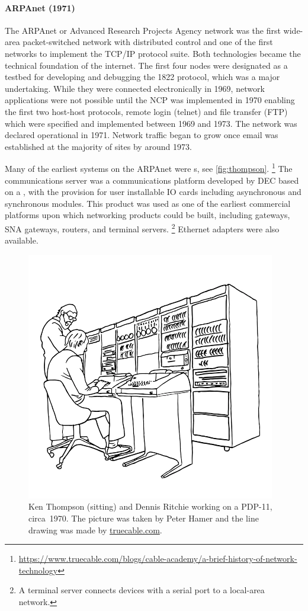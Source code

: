 {\paragraph{ARPAnet (1971)}
The ARPAnet or Advanced Research Projects Agency network was the first wide-area packet-switched network with distributed control and one of the first networks to implement the \acs{TCP}/\acs{IP} protocol suite.
Both technologies became the technical foundation of the internet.
The first four nodes were designated as a testbed for developing and debugging the 1822 protocol, which was a major undertaking.
While they were connected electronically in 1969, network applications were not possible until the \gls{NCP} was implemented in 1970 enabling the first two host-host protocols, remote login (telnet) and file transfer (\acs{FTP}) which were specified and implemented between 1969 and 1973.
The network was declared operational in 1971.
Network traffic began to grow once email was established at the majority of sites by around 1973.

Many of the earliest systems on the ARPAnet were s, see \vref{fig:thompson}.%
\footnote{\href{https://www.truecable.com/blogs/cable-academy/a-brief-history-of-network-technology}{https://www.truecable.com/blogs/cable-academy/a-brief-history-of-network-technology}}
The  communications server was a communications platform developed by \gls{DEC} based on a , with the provision for user installable \gls{IO} cards including asynchronous and synchronous modules.
This product was used as one of the earliest commercial platforms upon which networking products could be built, including  gateways, \gls{SNA} gateways, routers, and terminal servers.%
\footnote{A terminal server connects devices with a serial port to a local-area network.}
Ethernet adapters were also available.

\begin{figure}
\centering
\includegraphics[width=.5\textwidth]{images/thompson.png}
\caption{Ken Thompson (sitting) and Dennis Ritchie working on a PDP-11, circa~1970. The picture was taken by Peter Hamer and the line drawing was made by \href{https://www.truecable.com/blogs/cable-academy/a-brief-history-of-network-technology}{truecable.com}.}
\label{fig:thompson}
\end{figure}

}
